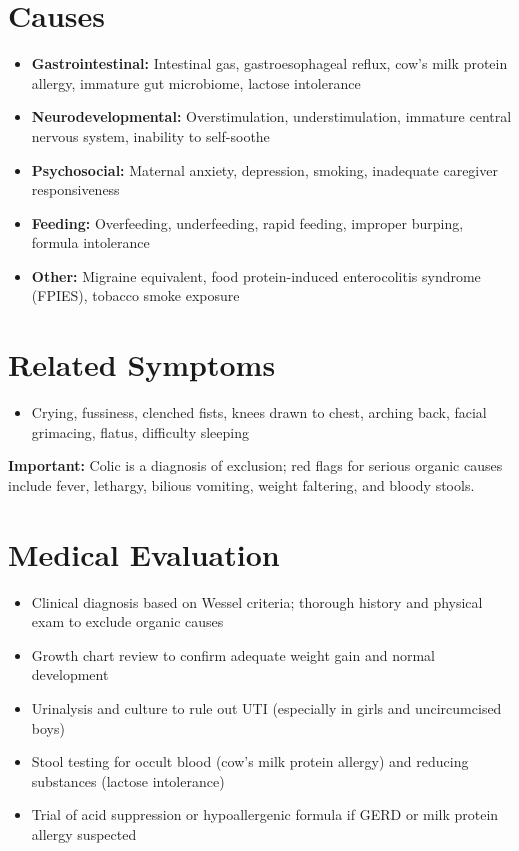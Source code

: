 \section*{Causes}
\begin{itemize}
  \item \textbf{Gastrointestinal:} Intestinal gas, gastroesophageal reflux, cow's milk protein allergy, immature gut microbiome, lactose intolerance
  \item \textbf{Neurodevelopmental:} Overstimulation, understimulation, immature central nervous system, inability to self-soothe
  \item \textbf{Psychosocial:} Maternal anxiety, depression, smoking, inadequate caregiver responsiveness
  \item \textbf{Feeding:} Overfeeding, underfeeding, rapid feeding, improper burping, formula intolerance
  \item \textbf{Other:} Migraine equivalent, food protein-induced enterocolitis syndrome (FPIES), tobacco smoke exposure
\end{itemize}

\section*{Related Symptoms}
\begin{itemize}
  \item Crying, fussiness, clenched fists, knees drawn to chest, arching back, facial grimacing, flatus, difficulty sleeping
\end{itemize}
\textbf{Important:} Colic is a diagnosis of exclusion; red flags for serious organic causes include fever, lethargy, bilious vomiting, weight faltering, and bloody stools.

\section*{Medical Evaluation}
\begin{itemize}
  \item Clinical diagnosis based on Wessel criteria; thorough history and physical exam to exclude organic causes
  \item Growth chart review to confirm adequate weight gain and normal development
  \item Urinalysis and culture to rule out UTI (especially in girls and uncircumcised boys)
  \item Stool testing for occult blood (cow's milk protein allergy) and reducing substances (lactose intolerance)
  \item Trial of acid suppression or hypoallergenic formula if GERD or milk protein allergy suspected
\end{itemize}

